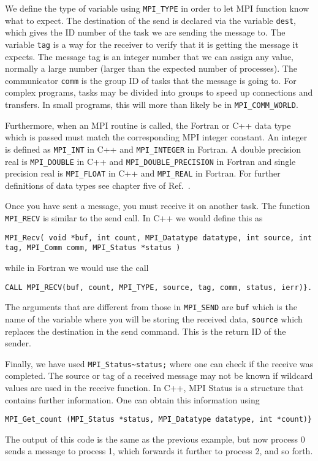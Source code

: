 We define the type of variable using \lstinline{MPI_TYPE}
in order to let  MPI function know  what to expect.  The destination of the send is declared via the variable 
\lstinline{dest}, which gives the  ID number of the task we are  sending the message to.
The variable \lstinline{tag} 
is a way for the receiver to verify that it is  getting the message it expects. 
The message tag is an integer number that we can assign any value, normally a large number (larger than the expected number of processes).
The communicator \lstinline{comm} is the group ID of tasks that the message is going to. 
For complex programs,  tasks may be divided into groups to speed up connections and transfers. 
In small programs, this will more than likely be in \lstinline{MPI_COMM_WORLD}.

Furthermore, when an MPI routine is called, the Fortran or C++ data type which is passed must match the corresponding 
MPI integer constant. An integer is defined as \lstinline{MPI_INT} in C++ and 
\lstinline{MPI_INTEGER}  in Fortran.  
A double precision real is
\lstinline{MPI_DOUBLE} in C++ and 
\lstinline{MPI_DOUBLE_PRECISION} in Fortran and single precision real is 
\lstinline{MPI_FLOAT} in C++ and 
\lstinline{MPI_REAL}  in  Fortran.  For further definitions of data types see chapter five of
Ref.~\cite{mpiref}.

Once you have  sent a message, you must receive it on another task. The function \lstinline{MPI_RECV} is similar to the send call.
In C++ we would define this as 
\begin{lstlisting}
MPI_Recv( void *buf, int count, MPI_Datatype datatype, int source, int tag, MPI_Comm comm, MPI_Status *status )
\end{lstlisting}
while in Fortran we would use the call 
\begin{lstlisting}
CALL MPI_RECV(buf, count, MPI_TYPE, source, tag, comm, status, ierr)}.
\end{lstlisting}
The arguments that are different from those in \lstinline{MPI_SEND} are
\lstinline{buf} which  is the name of the variable where you will  be storing the received data, 
\lstinline{source} which  replaces the destination in the send command. This is the return ID of the sender.

Finally,  we have used  \lstinline{MPI_Status~status;} 
where one can check if the receive was completed.
The source or tag of a received message may not be known if
wildcard values are used in the receive function. In C++, MPI Status
is a structure that contains further information. One can obtain this information
using 
\begin{lstlisting}
MPI_Get_count (MPI_Status *status, MPI_Datatype datatype, int *count)}
\end{lstlisting}
The output of this code is the same as the previous example, but now
process 0 sends a message to process 1, which forwards it further
to process 2, and so forth.


